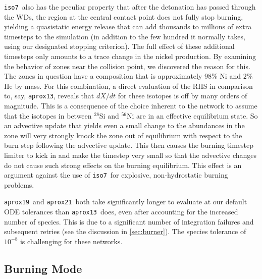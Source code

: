 \documentclass[twocolumn,numberedappendix]{../aastex6}
\newcommand{\isoseven}{\texttt{iso7}}
\newcommand{\aproxthirteen}{\texttt{aprox13}}
\newcommand{\aproxnineteen}{\texttt{aprox19}}
\newcommand{\aproxtwentyone}{\texttt{aprox21}}
\begin{document}
\isoseven\ also has the peculiar property that after the detonation has passed through the WDs,
the region at the central contact point does not fully stop burning, yielding a quasistatic energy
release that can add thousands to millions of extra timesteps to the simulation (in addition to the few
hundred it normally takes, using our designated stopping criterion). The full effect of these additional
timesteps only amounts to a trace change in the nickel production. By examining the behavior of zones
near the collision point, we discovered the reason for this. The zones in question have a composition that
is approximately $98\%$ Ni and $2\%$ He by mass. For this combination, a direct evaluation of the RHS in
comparison to, say, \aproxthirteen, reveals that $dX/dt$ for these isotopes is off by many orders of magnitude.
This is a consequence of the choice inherent to the network to assume that the isotopes in between $^{28}$Si
and $^{56}$Ni are in an effective equilibrium state. So an advective update that yields even a small change
to the abundances in the zone will very strongly knock the zone out of equilibrium with respect to the burn
step following the advective update. This then causes the burning timestep limiter to kick in and make the
timestep very small so that the advective changes do not cause such strong effects on the burning equilibrium.
This effect is an argument against the use of \isoseven\ for explosive, non-hydrostatic burning problems.

\aproxnineteen\ and \aproxtwentyone\ both take significantly longer to evaluate at our default
ODE tolerances than \aproxthirteen\ does, even after accounting for the increased number of species.
This is due to a significant number of integration failures and subsequent retries (see the discussion
in \autoref{sec:burner}). The species tolerance of $10^{-8}$ is challenging for these networks.



\subsection{Burning Mode}
\label{sec:parameters:burningmode}
\end{document}
